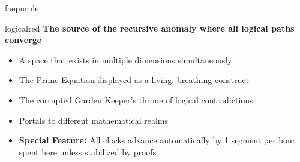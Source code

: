 \documentclass[11pt]{article}
\begin{document}
\begin{campaignsection}{faepurple}
\begin{mechanicbox}{logicalred}
\textbf{The source of the recursive anomaly where all logical paths converge}
\begin{itemize}
    \item A space that exists in multiple dimensions simultaneously
    \item The Prime Equation displayed as a living, breathing construct
    \item The corrupted Garden Keeper's throne of logical contradictions
    \item Portals to different mathematical realms
    \item \textbf{Special Feature:} All clocks advance automatically by 1 segment per hour spent here unless stabilized by proofs
\end{itemize}
\end{mechanicbox}
\end{campaignsection}

\newpage
\end{document}
